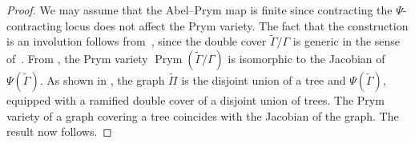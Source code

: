 \documentclass[11pt]{article}
\theoremstyle{definition}
\numberwithin{equation}{section}
\theoremstyle{definition}
\newcommand{\tGa}{\widetilde{\Gamma}}
\newcommand{\wt}[1]{\widetilde{#1}}
\DeclareMathOperator{\Prym}{Prym}
\begin{document}
\begin{proof}
    We may assume that the Abel--Prym map is finite since contracting the $\Psi$-contracting locus does not affect the Prym variety. 
    The fact that the construction is an involution follows from~\cite[Proposition 2.4]{RZ_ngonal}, since the double cover $\wt\Gamma/\Gamma$ is generic in the sense of~\cite[Definition 2.3]{RZ_ngonal}. 
From , the Prym variety $\Prym(\wt\Gamma/\Gamma)$ is isomorphic to the Jacobian of $\Psi(\tGa)$.  As shown in , the graph $\wt \Pi$ is the disjoint union of a tree and $\Psi(\tGa)$, equipped with a ramified double cover of a disjoint union of trees.  The Prym variety of a graph covering a tree coincides with the Jacobian of the graph. The result now follows.
\end{proof}
\end{document}
